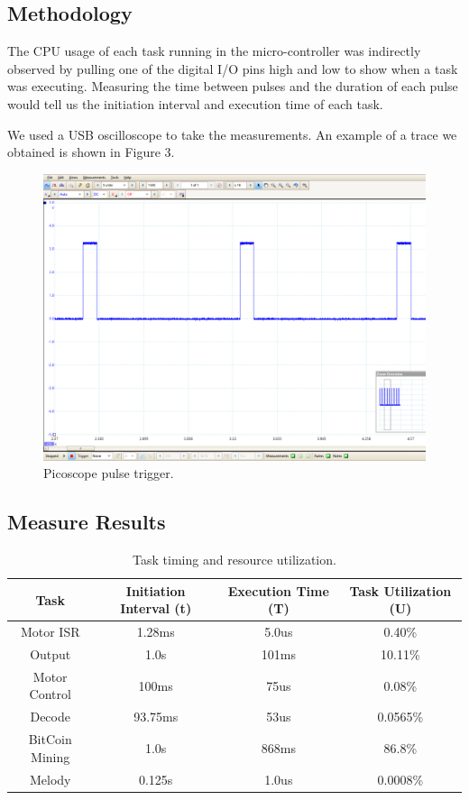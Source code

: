 \documentclass{article}
\begin{document}
\subsection{Methodology}

\noindent
The CPU usage of each task running in the micro-controller was indirectly observed by pulling one of the digital I/O pins high and low to show when a task was executing. Measuring the time between pulses and the duration of each pulse would tell us the initiation interval and execution time of each task.

\bigskip

\noindent
We used a USB oscilloscope to take the measurements. An example of a trace we obtained is shown in Figure 3.

\begin{figure}[H]
\begin{center}
   \includegraphics[width=0.6\linewidth]{ScopeOutput.png}
\end{center}
   \caption{Picoscope pulse trigger.}
\label{fig:long}
\label{fig:onecol}
\end{figure}


\subsection{Measure Results}

\begin{table}[ht]
\centering                      %
\begin{tabular}{c c c c}        %
Task & Initiation Interval (t) & Execution Time (T) & Task Utilization (U) \\ [0.5ex]   %
\hline                          %
Motor ISR & 1.28ms & 5.0us & 0.40\% \\           %
Output & 1.0s & 101ms & 10.11\% \\
Motor Control & 100ms & 75us  & 0.08\% \\
Decode & 93.75ms & 53us & 0.0565\% \\
BitCoin Mining & 1.0s & 868ms & 86.8\% \\
Melody & 0.125s & 1.0us & 0.0008\% \\[1ex]     %
\end{tabular}
\caption{Task timing and resource utilization.}
\label{table:nonlin}            %
\end{table}
\end{document}
